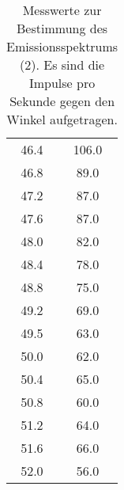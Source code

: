 \begin{table}[h]
\begin{tabular}{S S}
    46.4 & 106.0\\
    46.8 & 89.0\\
    47.2 & 87.0\\
    47.6 & 87.0\\
    48.0 & 82.0\\
    48.4 & 78.0\\
    48.8 & 75.0\\
    49.2 & 69.0\\
    49.5 & 63.0\\
    50.0 & 62.0\\
    50.4 & 65.0\\
    50.8 & 60.0\\
    51.2 & 64.0\\
    51.6 & 66.0\\
    52.0 & 56.0\\
    \bottomrule
  \end{tabular}
  \caption{Messwerte zur Bestimmung des Emissionsspektrums (2). Es sind die
  Impulse pro Sekunde gegen den Winkel aufgetragen.}
  \label{tab:emission2}
\end{table}


